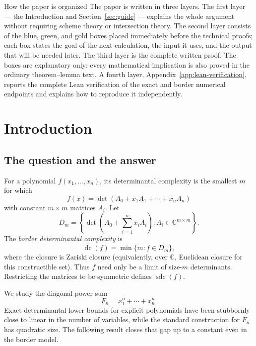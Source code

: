 \documentclass[acmsmall,screen,nonacm]{acmart}
\theoremstyle{definition}
\theoremstyle{remark}
\DeclareMathOperator{\dc}{dc}
\DeclareMathOperator{\sdc}{sdc}
\newcommand{\CC}{\mathbb{C}}
\newcommand{\dcb}{\overline{\dc}}
\newcommand{\sdcb}{\overline{\sdc}}
\begin{document}

\maketitle

\begin{readerbox}{How the paper is organized}
The paper is written in three layers.  The first layer --- the Introduction and
Section~\ref{sec:guide} --- explains the whole argument without requiring
scheme theory or intersection theory.  The second layer consists of the blue,
green, and gold boxes placed immediately before the technical proofs; each box
states the goal of the next calculation, the input it uses, and the output that
will be needed later.  The third layer is the complete written proof.  The boxes
are explanatory only: every mathematical implication is also proved in the
ordinary theorem--lemma text.  A fourth layer, Appendix~\ref{app:lean-verification},
reports the complete Lean verification of the exact and border numerical
endpoints and explains how to reproduce it independently.
\end{readerbox}

\section{Introduction}\label{sec:intro}

\subsection{The question and the answer}

For a polynomial $f(x_1,\ldots,x_n)$, its determinantal complexity is the smallest $m$ for which
\[
  f(x)=\det\!\left(A_0+x_1A_1+\cdots+x_nA_n\right)
\]
with constant $m\times m$ matrices $A_i$.  Let
\[
  D_m=\left\{\det\!\left(A_0+\sum_{i=1}^n x_iA_i\right):
  A_i\in\CC^{m\times m}\right\}.
\]
The \emph{border determinantal complexity} is
\[
  \dcb(f)=\min\{m:f\in\overline{D_m}\},
\]
where the closure is Zariski closure (equivalently, over $\CC$, Euclidean closure for this constructible set).  Thus $f$ need only be a limit of size-$m$ determinants.  Restricting the matrices to be symmetric defines $\sdcb(f)$.

We study the diagonal power sum
\[
  F_n=x_1^n+\cdots+x_n^n.
\]
Exact determinantal lower bounds for explicit polynomials have been stubbornly close to linear in the number of variables, while the standard construction for $F_n$ has quadratic size.  The following result closes that gap up to a constant even in the border model.
\end{document}
